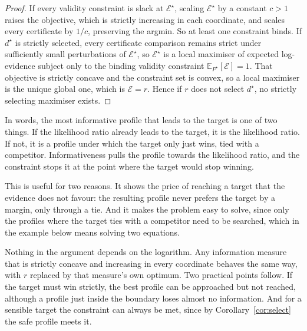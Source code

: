 \begin{proof}
If every validity constraint is slack at $\mathcal E^\star$, scaling
$\mathcal E^\star$ by a constant $c>1$ raises the objective, which is strictly
increasing in each coordinate, and scales every certificate by $1/c$,
preserving the argmin. So at least one constraint binds. If $d^\star$ is
strictly selected, every certificate comparison remains strict under
sufficiently small perturbations of $\mathcal E^\star$, so $\mathcal E^\star$
is a local maximiser of expected log-evidence subject only to the binding
validity constraint $\mathbb E_{P^\star}[\mathcal E]=1$. That objective is
strictly concave and the constraint set is convex, so a local maximiser is the
unique global one, which is $\mathcal E=r$. Hence if $r$ does not select
$d^\star$, no strictly selecting maximiser exists.
\end{proof}

In words, the most informative profile that leads to the target is one of two
things. If the likelihood ratio already leads to the target, it is the
likelihood ratio. If not, it is a profile under which the target only just
wins, tied with a competitor. Informativeness pulls the profile towards the
likelihood ratio, and the constraint stops it at the point where the target
would stop winning.

This is useful for two reasons. It shows the price of reaching a target that
the evidence does not favour: the resulting profile never prefers the target
by a margin, only through a tie. And it makes the problem easy to solve, since
only the profiles where the target ties with a competitor need to be searched,
which in the example below means solving two equations.

Nothing in the argument depends on the logarithm. Any information measure that is strictly
concave and increasing in every coordinate behaves the same way, with $r$
replaced by that measure's own optimum. Two practical points follow. If the
target must win strictly, the best profile can be approached but not reached,
although a profile just inside the boundary loses almost no information. And
for a sensible target the constraint can always be met, since by
Corollary~\ref{cor:select} the safe profile meets it.

